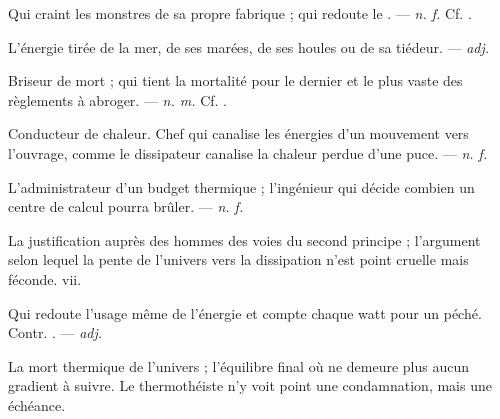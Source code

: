  Qui craint les monstres de sa propre fabrique ; qui redoute le . ---  \textit{n. f.} Cf. .

 L'énergie tirée de la mer, de ses marées, de ses houles ou de sa tiédeur. ---  \textit{adj.}

 Briseur de mort ; qui tient la mortalité pour le dernier et le plus vaste des règlements à abroger.  ---  \textit{n. m.} Cf. .

  Conducteur de chaleur.   Chef qui canalise les énergies d'un mouvement vers l'ouvrage, comme le dissipateur canalise la chaleur perdue d'une puce. ---  \textit{n. f.}

 L'administrateur d'un budget thermique ; l'ingénieur qui décide combien un centre de calcul pourra brûler. ---  \textit{n. f.}

 La justification auprès des hommes des voies du second principe ; l'argument selon lequel la pente de l'univers vers la dissipation n'est point cruelle mais féconde.   vii.

 Qui redoute l'usage même de l'énergie et compte chaque watt pour un péché. Contr. . ---  \textit{adj.}

 La mort thermique de l'univers ; l'équilibre final où ne demeure plus aucun gradient à suivre. Le thermothéiste n'y voit point une condamnation, mais une échéance. 

